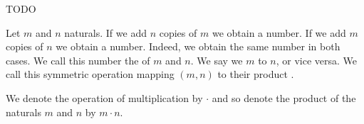 
\sbasic










\sstart
{}


TODO


Let $m$ and $n$ naturals.
If we add $n$ copies of $m$ we obtain a number.
If we add $m$ copies of $n$ we obtain a number.
Indeed, we obtain the same number in both cases.
We call this number the  of $m$ and $n$.
We say we  $m$ to $n$, or vice versa.
We call this symmetric operation mapping $(m, n)$ to their product
.


We denote the operation of multiplication by
$\cdot$ and so denote the product of the naturals
$m$ and $n$ by $m \cdot n$.
\strats
